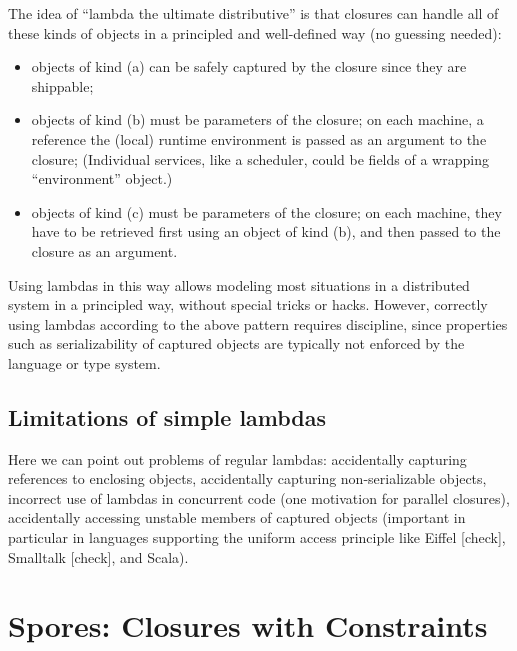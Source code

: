 \documentclass{llncs}
\begin{document}
The idea of ``lambda the ultimate distributive'' is that closures can handle
all of these kinds of objects in a principled and well-defined way (no
guessing needed):

\begin{itemize}

\item objects of kind (a) can be safely captured by the closure since they are shippable;

\item objects of kind (b) must be parameters of the closure; on each machine,
a reference the (local) runtime environment is passed as an argument to the
closure; (Individual services, like a scheduler, could be fields of a
wrapping ``environment'' object.)

\item objects of kind (c) must be parameters of the closure; on each machine,
they have to be retrieved first using an object of kind (b), and then passed
to the closure as an argument.

\end{itemize}

Using lambdas in this way allows modeling most situations 
in a distributed system in a principled way, without special tricks or
hacks. However, correctly using lambdas according to the above pattern
requires discipline, since properties such as serializability of captured
objects are typically not enforced by the language or type system.

\subsection{Limitations of simple lambdas}

Here we can point out problems of regular lambdas: accidentally capturing
references to enclosing objects, accidentally capturing non-serializable
objects, incorrect use of lambdas in concurrent code (one motivation for
parallel closures), accidentally accessing unstable members of captured
objects (important in particular in languages supporting the uniform access
principle like Eiffel [check], Smalltalk [check], and Scala).


\section{Spores: Closures with Constraints}
\end{document}
